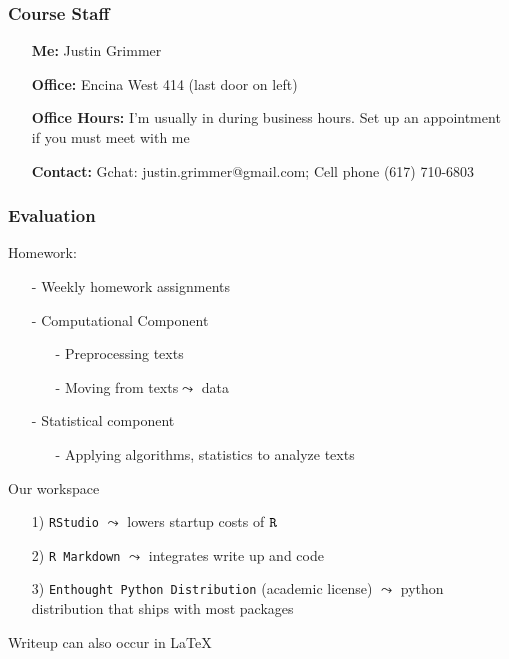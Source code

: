 \documentclass{beamer}
\begin{document}
\begin{frame}
\frametitle{Course Staff}

\begin{itemize}
\item[] \textbf{Me:} Justin Grimmer
\item[] \textbf{Office:} Encina West 414 (last door on left)
\item[] \textbf{Office Hours:} I'm usually in during business hours. Set up an appointment if you must meet with me
\item[] \textbf{Contact:} Gchat: justin.grimmer@gmail.com; Cell phone (617) 710-6803
\end{itemize}

\pause 



\end{frame}


\begin{frame}
\frametitle{Evaluation}

\alert{Homework}:

\begin{itemize}
\item[-] Weekly homework assignments
\item[-] Computational Component
\begin{itemize}
\item[-] Preprocessing texts
\item[-] Moving from texts$\leadsto$ data
\end{itemize}
\item[-] Statistical component
\begin{itemize}
\item[-] Applying algorithms, statistics to analyze texts
\end{itemize}
\end{itemize}

Our workspace
\begin{itemize}
\item[1)] {\tt RStudio} $\leadsto$ lowers startup costs of ${\tt R}$ 
\item[2)] {\tt R Markdown} $\leadsto$ integrates write up and code
\item[3)] {\tt Enthought Python Distribution} (academic license) $\leadsto$ python distribution that ships with most packages
\end{itemize}

Writeup can also occur in \LaTeX\ 


\end{frame}
\end{document}
